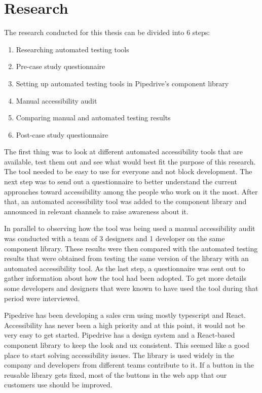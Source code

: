 \documentclass{master_thesis}
\begin{document}
\section{Research} \label{chap:research}

The research conducted for this thesis can be divided into 6 steps:

\begin{enumerate}
	\item Researching automated testing tools
	\item Pre-case study questionnaire
	\item Setting up automated testing tools in Pipedrive's component library
	\item Manual accessibility audit
	\item Comparing manual and automated testing results
	\item Post-case study questionnaire
\end{enumerate}

The first thing was to look at different automated accessibility tools that are available, test them out and see what would best fit the purpose of this research. The tool needed to be easy to use for everyone and not block development. The next step was to send out a questionnaire to better understand the current approaches toward accessibility among the people who work on it the most. After that, an automated accessibility tool was added to the component library and announced in relevant channels to raise awareness about it.

In parallel to observing how the tool was being used a manual accessibility audit was conducted with a team of 3 designers and 1 developer on the same component library. These results were then compared with the automated testing results that were obtained from testing the same version of the library with an automated accessibility tool. As the last step, a questionnaire was sent out to gather information about how the tool had been adopted. To get more details some developers and designers that were known to have used the tool during that period were interviewed.

Pipedrive has been developing a sales \ac{crm} using mostly typescript and React. Accessibility has never been a high priority and at this point, it would not be very easy to get started. Pipedrive has a design system and a React-based component library to keep the look and \ac{ux} consistent. This seemed like a good place to start solving accessibility issues. The library is used widely in the company and developers from different teams contribute to it. If a button in the reusable library gets fixed, most of the buttons in the web app that our customers use should be improved.
\end{document}
